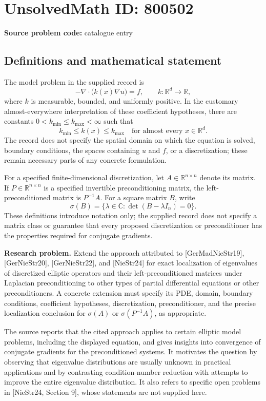 \documentclass[11pt]{article}
\newcommand{\R}{\mathbb{R}}
\newcommand{\C}{\mathbb{C}}
\begin{document}
\section*{UnsolvedMath ID: 800502}
\textbf{Source problem code:} catalogue entry
\subsection{Definitions and mathematical statement}
The model problem in the supplied record is
\[
-\nabla\!\cdot\!\bigl(k(x)\nabla u\bigr)=f,
\qquad k:\R^d\longrightarrow\R,
\]
where \(k\) is measurable, bounded, and uniformly positive. In the customary almost-everywhere interpretation of these coefficient hypotheses, there are constants \(0<k_{\min}\le k_{\max}<\infty\) such that
\[
k_{\min}\le k(x)\le k_{\max}
\quad\text{for almost every }x\in\R^d.
\]
The record does not specify the spatial domain on which the equation is solved, boundary conditions, the spaces containing \(u\) and \(f\), or a discretization; these remain necessary parts of any concrete formulation.

For a specified finite-dimensional discretization, let \(A\in\R^{n\times n}\) denote its matrix. If \(P\in\R^{n\times n}\) is a specified invertible preconditioning matrix, the left-preconditioned matrix is \(P^{-1}A\). For a square matrix \(B\), write
\[
\sigma(B)=\{\lambda\in\C:\det(B-\lambda I_n)=0\}.
\]
These definitions introduce notation only; the supplied record does not specify a matrix class or guarantee that every proposed discretization or preconditioner has the properties required for conjugate gradients.

\textbf{Research problem.} Extend the approach attributed to [GerMadNieStr19], [GerNieStr20], [GerNieStr22], and [NieStr24] for exact localization of eigenvalues of discretized elliptic operators and their left-preconditioned matrices under Laplacian preconditioning to other types of partial differential equations or other preconditioners. A concrete extension must specify its PDE, domain, boundary conditions, coefficient hypotheses, discretization, preconditioner, and the precise localization conclusion for \(\sigma(A)\) or \(\sigma(P^{-1}A)\), as appropriate.

The source reports that the cited approach applies to certain elliptic model problems, including the displayed equation, and gives insights into convergence of conjugate gradients for the preconditioned systems. It motivates the question by observing that eigenvalue distributions are usually unknown in practical applications and by contrasting condition-number reduction with attempts to improve the entire eigenvalue distribution. It also refers to specific open problems in [NieStr24, Section 9], whose statements are not supplied here.
\end{document}
